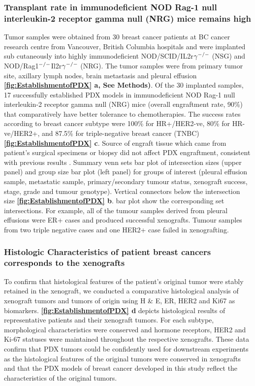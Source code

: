 \subsubsection{Transplant rate in immunodeficient NOD Rag-1 null interleukin-2 receptor gamma null (NRG) mice  remains high}
Tumor samples were obtained from 30 breast cancer patients at BC cancer research centre from Vancouver, British Columbia hospitals and were implanted sub cutaneously into highly immunodeficient NOD/SCID/IL2r$\gamma^{\small{-/-}}$ (NSG) and NOD/Rag1$^{\small{-/-}}$Il2r$\gamma ^{\small{-/-}}$ (NRG)\cite{pearson2008non}. The tumor samples were from primary tumor site, axillary lymph nodes, brain metastasis and pleural effusion \textbf{\autoref{fig:EstablishmentofPDX} a, See Methods)}.
Of the 30 implanted samples, 17 successfully established PDX models in immunodeficient NOD Rag-1 null interleukin-2 receptor gamma null (NRG) mice (overall engraftment rate, 90\%) that comparatively have better tolerance to chemotherapies. The success rates according to breast cancer subtype were 100\% for HR+/HER2-ve, 80\% for HR-ve/HER2+, and 87.5\% for triple-negative breast cancer (TNBC) \textbf{\autoref{fig:EstablishmentofPDX} c}. Source of engraft tissue which came from patient's surgical specimens or biopsy did not affect PDX engraftment, consistent with previous results \cite{ryu2019integrative}. Summary venn sets bar plot of intersection sizes (upper panel) and group size bar plot (left panel) for groups of interest (pleural effusion sample, metastatic sample, primary/secondary tumour status, xenograft success, stage, grade and tumour genotype). Vertical connectors below the intersection size \textbf{\autoref{fig:EstablishmentofPDX} b}.
bar plot show the corresponding set intersections. For example, all of the tumour samples derived from pleural effusions were ER+ cases and produced successful xenografts. Tumour samples from two triple negative cases and one HER2+ case failed in xenografting.


\subsubsection{Histologic Characteristics of patient breast cancers corresponds to the xenografts}

To confirm that histological features of the patient’s original tumor were stably retained in the xenograft, we conducted a comparative histological analysis of xenograft tumors and tumors of origin using H \& E, ER, HER2 and Ki67 as biomarkers. 
\textbf{\autoref{fig:EstablishmentofPDX} d} depicts histological results of representative patients and their xenograft tumors. For each subtype, morphological characteristics were conserved and hormone receptors, HER2 and Ki-67 statuses were maintained throughout the respective xenografts. These data confirm that PDX tumors could be confidently used for downstream experiments as the histological features of the original tumors were conserved in xenografts and that the PDX models of breast cancer developed in this study reflect the characteristics of the original tumors.



